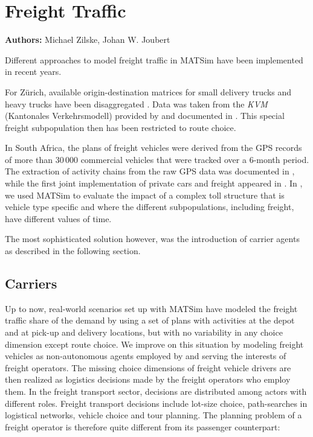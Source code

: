 \chapter{Freight Traffic}
\label{ch:freight}

\hfill \textbf{Authors:} Michael Zilske, Johan W. Joubert



Different approaches to model freight traffic in MATSim have been implemented in recent years. 

For Zürich, available origin-destination matrices for small delivery trucks and heavy trucks have been disaggregated \citet[][]{ShahM_TechRep_IVT_2010}. Data was taken from the \emph{KVM} (Kantonales Verkehrsmodell) provided by \citet{AMV_Webpage_2011} and documented in \citet[][]{GottardiBuergler_SV_1999}. This special freight subpopulation then has been restricted to route choice.

In South Africa, the plans of freight vehicles were derived from the GPS records of more than 30\,000 commercial vehicles that were tracked over a 6-month period. The extraction of activity chains from the raw GPS data was documented in \citet[][]{JoubertAxhausen_JTG_2011}, while the first joint implementation of private cars and freight appeared in \citet[][]{JoubertJEtAl_TRR_2010}. In \citet[][]{NagelKickhoeferJoubert2014HeterogeneousVoTsPROCEDIA}, we used MATSim to evaluate the impact of a complex toll structure that is vehicle type specific and where the different subpopulations, including freight, have different values of time.

The most sophisticated solution however, was the introduction of carrier agents as described in the following section. 

\section{Carriers}
\label{sec:carriers}
Up to now, real-world scenarios set up with MATSim have modeled the freight traffic share of the demand by using a set of plans with activities at the depot and at pick-up and delivery locations, but with no variability in any choice dimension except route choice. We improve on this situation by modeling freight vehicles as non-autonomous agents employed by and serving the interests of freight operators. The missing choice dimensions of freight vehicle drivers are then realized as logistics decisions made by the freight operators who employ them. In the freight transport sector, decisions are distributed among actors with different roles. Freight transport decisions include lot-size choice, path-searches in logistical networks, vehicle choice and tour planning. The planning problem of a freight operator is therefore quite different from its passenger counterpart:

